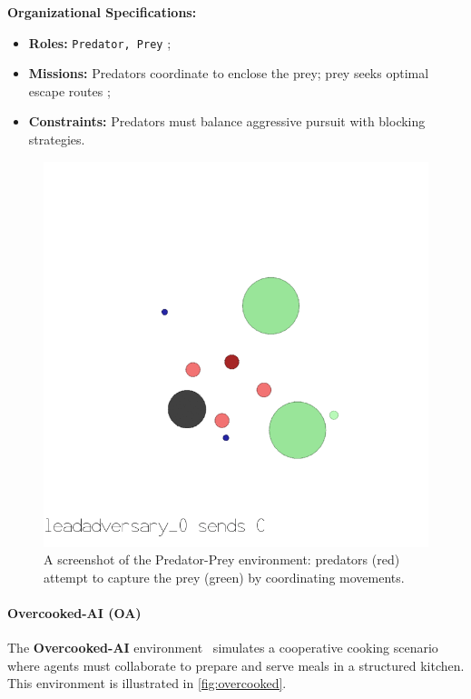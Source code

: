\documentclass[pdflatex,sn-mathphys-num]{sn-jnl}%
\theoremstyle{thmstyleone}%
\theoremstyle{thmstyletwo}%
\theoremstyle{thmstylethree}%
\begin{document}
\textbf{Organizational Specifications:} 
\begin{itemize}
    \item \textbf{Roles:} \texttt{Predator, Prey} ;
    \item \textbf{Missions:} Predators coordinate to enclose the prey; prey seeks optimal escape routes ;
    \item \textbf{Constraints:} Predators must balance aggressive pursuit with blocking strategies.
\end{itemize}

\begin{figure}[h!]
    \centering
    \includegraphics[width=0.7\linewidth]{figures/predator_prey.png}
    \caption{A screenshot of the Predator-Prey environment: predators (red) attempt to capture the prey (green) by coordinating movements.}
    \label{fig:predator_prey}
\end{figure}

\paragraph{Overcooked-AI (OA)}
The \textbf{Overcooked-AI} environment~\cite{overcookedai} simulates a cooperative cooking scenario where agents must collaborate to prepare and serve meals in a structured kitchen. This environment is illustrated in \autoref{fig:overcooked}.
\end{document}
